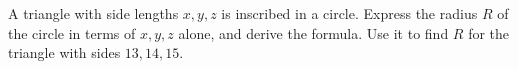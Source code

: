 A triangle with side lengths $x,y,z$ is inscribed in a circle. Express the radius $R$ of the circle in terms of $x,y,z$ alone, and derive the formula. Use it to find $R$ for the triangle with sides $13,14,15$.
